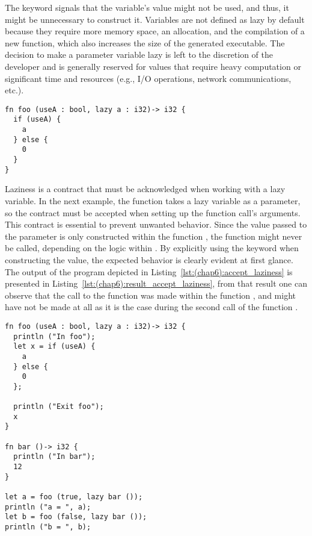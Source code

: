 The keyword  signals that the variable's value might not be used,
and thus, it might be unnecessary to construct it. Variables are not defined as
lazy by default because they require more memory space, an allocation, and the
compilation of a new function, which also increases the size of the generated
executable. The decision to make a parameter variable lazy is left to the
discretion of the developer and is generally reserved for values that require
heavy computation or significant time and resources (e.g., I/O operations,
network communications, etc.).

\begin{lstlisting}[style=coloredverbatim]
fn foo (useA : bool, lazy a : i32)-> i32 {
  if (useA) {
    a
  } else {
    0
  }
}
\end{lstlisting}

Laziness is a contract that must be acknowledged when working with a lazy
variable. In the next example, the function  takes a lazy variable as
a parameter, so the contract must be accepted when setting up the function
call's arguments. This contract is essential to prevent unwanted behavior. Since
the value passed to the parameter  is only constructed within the
function , the function  might never be called, depending
on the logic within . By explicitly using the  keyword
when constructing the value, the expected behavior is clearly evident at first
glance. The output of the program depicted in Listing~\ref{lst:(chap6):accept_laziness}
is presented in Listing~\ref{lst:(chap6):result_accept_laziness}, from that result one
can observe that the call to the function  was made within the
function , and might have not be made at all as it is the case during
the second call of the function .

\begin{lstlisting}[style=coloredverbatim, label=lst:(chap6):accept_laziness, caption=Example of laziness contract acceptance]
fn foo (useA : bool, lazy a : i32)-> i32 {
  println ("In foo");
  let x = if (useA) {
    a
  } else {
    0
  };

  println ("Exit foo");
  x
}

fn bar ()-> i32 {
  println ("In bar");
  12
}

let a = foo (true, lazy bar ());
println ("a = ", a);
let b = foo (false, lazy bar ());
println ("b = ", b);
\end{lstlisting}

